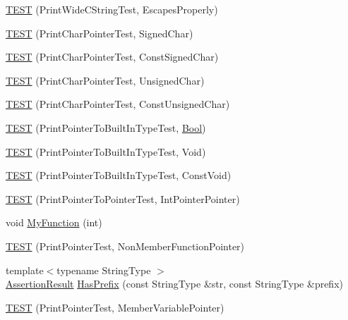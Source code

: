 \begin{DoxyCompactItemize}
\hyperlink{namespacetesting_1_1gtest__printers__test_aa80d6bb47e6bf997dacf0c75322d12cf}{T\+E\+ST} (Print\+Wide\+C\+String\+Test, Escapes\+Properly)
\item 
\hyperlink{namespacetesting_1_1gtest__printers__test_acd7a56709621a91dca669023d192bdc7}{T\+E\+ST} (Print\+Char\+Pointer\+Test, Signed\+Char)
\item 
\hyperlink{namespacetesting_1_1gtest__printers__test_ae854b0ca4d06ffc273c391f262884681}{T\+E\+ST} (Print\+Char\+Pointer\+Test, Const\+Signed\+Char)
\item 
\hyperlink{namespacetesting_1_1gtest__printers__test_afb9a6a26323b287b7666b6adb5bdb149}{T\+E\+ST} (Print\+Char\+Pointer\+Test, Unsigned\+Char)
\item 
\hyperlink{namespacetesting_1_1gtest__printers__test_aa0487f8fd5052f7d6afe2b18ad7931f9}{T\+E\+ST} (Print\+Char\+Pointer\+Test, Const\+Unsigned\+Char)
\item 
\hyperlink{namespacetesting_1_1gtest__printers__test_ad08dcd672b1e66a802a564eb974c400a}{T\+E\+ST} (Print\+Pointer\+To\+Built\+In\+Type\+Test, \hyperlink{struct_bool}{Bool})
\item 
\hyperlink{namespacetesting_1_1gtest__printers__test_ac6d8b84db9386b399eb431b5b1668e87}{T\+E\+ST} (Print\+Pointer\+To\+Built\+In\+Type\+Test, Void)
\item 
\hyperlink{namespacetesting_1_1gtest__printers__test_a8819fb42392faae72e8bc594d498085d}{T\+E\+ST} (Print\+Pointer\+To\+Built\+In\+Type\+Test, Const\+Void)
\item 
\hyperlink{namespacetesting_1_1gtest__printers__test_afee54807b15b623718c62008bd743d4b}{T\+E\+ST} (Print\+Pointer\+To\+Pointer\+Test, Int\+Pointer\+Pointer)
\item 
void \hyperlink{namespacetesting_1_1gtest__printers__test_adf0e590d6776ecb7095a989ff2272d7b}{My\+Function} (int)
\item 
\hyperlink{namespacetesting_1_1gtest__printers__test_aa3cb60cf6f3a4a0cd7d9873cd597ffd8}{T\+E\+ST} (Print\+Pointer\+Test, Non\+Member\+Function\+Pointer)
\item 
{\footnotesize template$<$typename String\+Type $>$ }\\\hyperlink{classtesting_1_1_assertion_result}{Assertion\+Result} \hyperlink{namespacetesting_1_1gtest__printers__test_abbd436200da6c80944c8a7504fb56ea1}{Has\+Prefix} (const String\+Type \&str, const String\+Type \&prefix)
\item 
\hyperlink{namespacetesting_1_1gtest__printers__test_a434cafcc1dbee409992bbb1593034480}{T\+E\+ST} (Print\+Pointer\+Test, Member\+Variable\+Pointer)

\end{DoxyCompactItemize}
